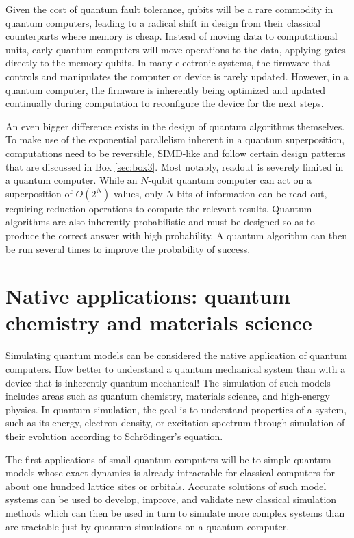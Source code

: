 \documentclass[journal]{IEEEtran}
\begin{document}
Given the cost of quantum fault tolerance, qubits will be a rare commodity in quantum computers, leading to a radical shift in design from their classical counterparts where memory is cheap. Instead of moving data to computational units, early quantum computers will move operations to the data, applying gates directly to the memory qubits.  
In many electronic systems, the firmware that controls and manipulates the computer or device is rarely updated.  However, in a quantum computer, the firmware is inherently being optimized and updated continually during computation to reconfigure the device for the next steps.

 An even bigger difference exists in the design of quantum algorithms themselves. To make use of the  exponential parallelism inherent in a quantum superposition, computations need to be reversible, SIMD-like and follow certain design patterns that are discussed in Box \ref{sec:box3}.   Most notably, readout is severely limited in a quantum computer. While an $N$-qubit quantum computer can act on a superposition of $O(2^N)$ values, only $N$ bits of information can be read out, requiring reduction operations to compute the relevant results.
 Quantum algorithms are also inherently probabilistic and must be designed so as to produce the correct answer with high probability.  A quantum algorithm can then be run several times to improve the probability of success. 
 
 
 



\section{Native applications: quantum chemistry and materials science}

Simulating quantum models can be considered the native application of quantum computers. How better to understand a quantum mechanical system than with a device that is inherently quantum mechanical! The simulation of such models includes areas such as quantum chemistry, materials science, and high-energy physics. In quantum simulation, the goal is to understand properties of a system, such as its energy, electron density, or excitation spectrum through simulation of their evolution according to Schr\"odinger's equation.  

The first applications of small quantum computers will be to simple quantum models whose exact dynamics is already intractable for classical computers for about one hundred lattice sites or orbitals.  Accurate solutions of such model systems can be used to develop, improve, and validate new classical simulation methods which can then be used in turn to simulate more complex systems than are tractable just by quantum simulations on a quantum computer. 
\end{document}
